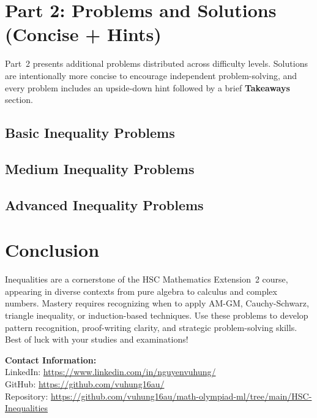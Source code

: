\documentclass[12pt]{article}
\begin{document}
\section{Part 2: Problems and Solutions (Concise + Hints)}
Part~2 presents additional problems distributed across difficulty levels. Solutions are intentionally more concise to encourage independent problem-solving, and every problem includes an upside-down hint followed by a brief \textbf{Takeaways} section.

\subsection{Basic Inequality Problems}


\subsection{Medium Inequality Problems}


\subsection{Advanced Inequality Problems}


\section{Conclusion}
Inequalities are a cornerstone of the HSC Mathematics Extension~2 course, appearing in diverse contexts from pure algebra to calculus and complex numbers. Mastery requires recognizing when to apply AM-GM, Cauchy-Schwarz, triangle inequality, or induction-based techniques. Use these  problems to develop pattern recognition, proof-writing clarity, and strategic problem-solving skills. Best of luck with your studies and examinations!

\vspace{2em}
\noindent\textbf{Contact Information:}\\[0.5em]
LinkedIn: \href{https://www.linkedin.com/in/nguyenvuhung/}{https://www.linkedin.com/in/nguyenvuhung/}\\[0.3em]
GitHub: \href{https://github.com/vuhung16au/}{https://github.com/vuhung16au/}\\[0.3em]
Repository: \href{https://github.com/vuhung16au/math-olympiad-ml/tree/main/HSC-Inequalities}{https://github.com/vuhung16au/math-olympiad-ml/tree/main/HSC-Inequalities}
\end{document}
